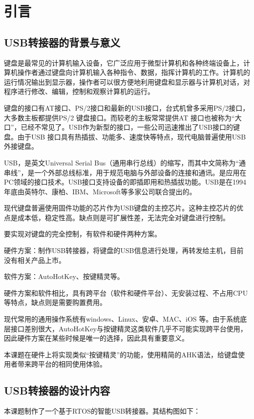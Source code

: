 
\chapter{引言}
\section{USB转接器的背景与意义}
键盘是最常见的计算机输入设备，它广泛应用于微型计算机和各种终端设备上，计算机操作者通过键盘向计算机输入各种指令、数据，指挥计算机的工作。计算机的运行情况输出到显示器，操作者可以很方便地利用键盘和显示器与计算机对话，对程序进行修改、编辑，控制和观察计算机的运行。

键盘的接口有AT接口、PS/2接口和最新的USB接口，台式机曾多采用PS/2接口，大多数主板都提供PS/2 键盘接口。而较老的主板常常提供AT 接口也被称为“大口”，已经不常见了。USB作为新型的接口，一些公司迅速推出了USB接口的键盘。由于USB 接口具有热插拔、功能多、速度快等特点，现代电脑普遍使用USB外接键盘。

USB，是英文Universal Serial Bus（通用串行总线）的缩写，而其中文简称为“通串线”，是一个外部总线标准，用于规范电脑与外部设备的连接和通讯。是应用在PC领域的接口技术。USB接口支持设备的即插即用和热插拔功能。USB是在1994年底由英特尔、康柏、IBM、Microsoft等多家公司联合提出的。

现代键盘普遍使用固件功能的芯片作为USB键盘的主控芯片。这种主控芯片的优点是成本低，稳定性高。缺点则是可扩展性差，无法完全对键盘进行控制。

要实现对键盘的完全控制，有软件和硬件两种方案。

硬件方案：制作USB转接器，将键盘的USB信息进行处理，再转发给主机，目前没有相关产品上市。


软件方案：AutoHotKey、按键精灵等。

硬件方案和软件相比，具有跨平台（软件和硬件平台）、无安装过程、不占用CPU等特点，缺点则是需要购置费用。

现代常用的通用操作系统有windows、Linux、安卓、MAC、iOS 等。由于系统底层接口差别很大，AutoHotKey与按键精灵这类软件几乎不可能实现跨平台使用，因此硬件方案在某些时候是唯一的选择，因此具有重要意义。

本课题在硬件上将实现类似“按键精灵”的功能，使用精简的AHK语法，给键盘使用者带来跨平台的相同使用体验。
\section{USB转接器的设计内容}
本课题制作了一个基于RTOS的智能USB转接器。其结构图如下：

